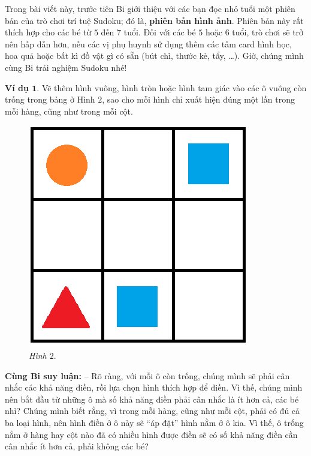 	\vskip 0.1cm
	Trong bài viết này, trước tiên Bi giới thiệu với các bạn đọc nhỏ tuổi một phiên bản của trò chơi trí tuệ Sudoku; đó là, \textbf{\color{toancuabi}phiên bản hình ảnh}. Phiên bản này rất thích hợp cho các bé từ $5$ đến $7$ tuổi.
	\vskip 0.1cm
	Đối với các bé $5$ hoặc $6$ tuổi, trò chơi sẽ trở nên hấp dẫn hơn, nếu các vị phụ huynh sử dụng thêm các tấm card hình học, hoa quả hoặc bất kì đồ vật gì có sẵn (bút chì, thước kẻ, tẩy, \ldots).
	\vskip 0.15cm
	Giờ, chúng mình cùng Bi trải nghiệm  Sudoku nhé!
	\begin{multicols}{2}
		\textbf{\color{toancuabi}Ví dụ $\pmb 1.$} Vẽ thêm hình vuông, hình tròn hoặc hình tam giác vào các ô vuông còn trống trong bảng ở Hình $2$, sao cho mỗi hình chỉ xuất hiện đúng một lần trong mỗi hàng, cũng như trong mỗi cột.
		\begin{figure}[H]
			\vspace*{5pt}
			\centering
			\captionsetup{labelformat=empty, justification=centering}
			\includegraphics[scale=0.33]{hinh2}
			\caption{\textit{\small Hình $2.$}}
			\vspace*{-10pt}
		\end{figure}
	\end{multicols}
	\textbf{\color{toancuabi}Cùng Bi suy luận:}
	\vskip 0.15cm
	-- Rõ ràng, với mỗi ô còn trống, chúng mình sẽ phải cân nhắc các khả năng điền, rồi lựa chọn hình thích hợp để điền. Vì thế, chúng mình nên bắt đầu từ những ô mà số khả năng điền phải cân nhắc là ít hơn cả, các bé nhỉ? Chúng mình biết rằng, vì trong mỗi hàng, cũng như mỗi cột, phải có đủ cả ba loại hình, nên hình điền ở ô này sẽ “áp đặt” hình nằm ở ô kia. Vì thế, ô trống nằm ở hàng hay cột nào đã có nhiều hình được điền sẽ có số khả năng điền cần cân nhắc ít hơn cả, phải không các bé?

